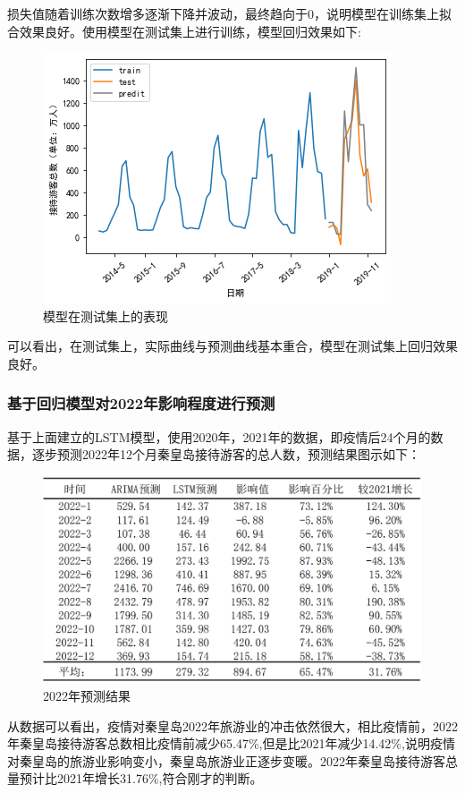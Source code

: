 损失值随着训练次数增多逐渐下降并波动，最终趋向于0，说明模型在训练集上拟合效果良好。使用模型在测试集上进行训练，模型回归效果如下:\begin{figure}[H]
	\centering
	\includegraphics[scale=0.55,angle=0]{images/18.png}
	\caption{模型在测试集上的表现}
	\label{18}
\end{figure}

可以看出，在测试集上，实际曲线与预测曲线基本重合，模型在测试集上回归效果良好。
		\subsubsection{基于回归模型对2022年影响程度进行预测}
		基于上面建立的LSTM模型，使用2020年，2021年的数据，即疫情后24个月的数据，逐步预测2022年12个月秦皇岛接待游客的总人数，预测结果图示如下：\begin{figure}[h]
			\centering
			\includegraphics[scale=0.5,angle=0]{images/20.png}
			\caption{2022年预测结果}
			\label{20}
		\end{figure}
	
	从数据可以看出，疫情对秦皇岛2022年旅游业的冲击依然很大，相比疫情前，2022年秦皇岛接待游客总数相比疫情前减少65.47\%,但是比2021年减少14.42\%,说明疫情对秦皇岛的旅游业影响变小，秦皇岛旅游业正逐步变暖。2022年秦皇岛接待游客总量预计比2021年增长31.76\%,符合刚才的判断。
	\clearpage
	
